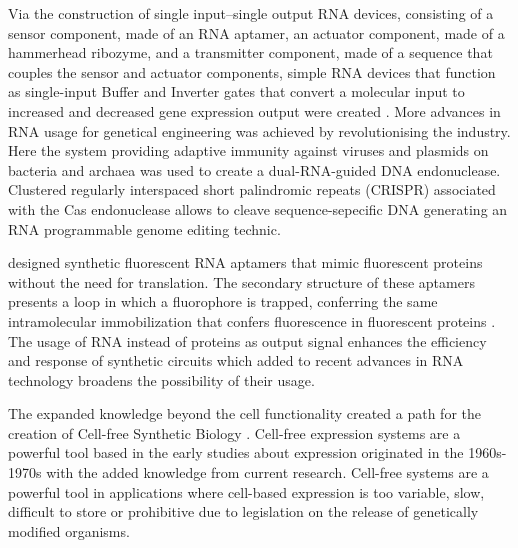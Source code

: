 Via the construction of single input–single output RNA devices, consisting of a sensor component, made of an RNA aptamer, an actuator component, made of a hammerhead ribozyme, and a transmitter component, made of a sequence that couples the sensor and actuator components, simple RNA devices that function as single-input Buffer and Inverter gates that convert a molecular input to increased and decreased gene expression output were created \citep{win2008higher}. More advances in RNA usage for genetical engineering was achieved by \cite{jinek2012programmable} revolutionising the industry. Here the system providing adaptive immunity against viruses and plasmids on bacteria and archaea was used to create a dual-RNA-guided DNA endonuclease. Clustered regularly interspaced short palindromic repeats (CRISPR) associated with the Cas endonuclease allows to cleave sequence-sepecific DNA generating an RNA programmable genome editing technic. 

\citet{paige2011rna} designed synthetic fluorescent RNA aptamers that mimic fluorescent proteins without the need for translation. The secondary structure of these aptamers presents a loop in which a fluorophore is trapped, conferring the same intramolecular immobilization that confers fluorescence in fluorescent proteins \citep{paige2011rna, strack2013superfolding}. The usage of RNA instead of proteins as output signal enhances the efficiency and response of synthetic circuits which added to recent advances in RNA technology broadens the possibility of their usage.

The expanded knowledge beyond the cell functionality created a path for the creation of Cell-free Synthetic Biology \citep{hodgman2012cell}. Cell-free expression systems are a powerful tool based in the early studies about expression originated in the 1960s-1970s with the added knowledge from current research. Cell-free systems are a powerful tool in applications where cell-based expression is too variable, slow, difficult to store or prohibitive due to legislation on the release of genetically modified organisms. 

